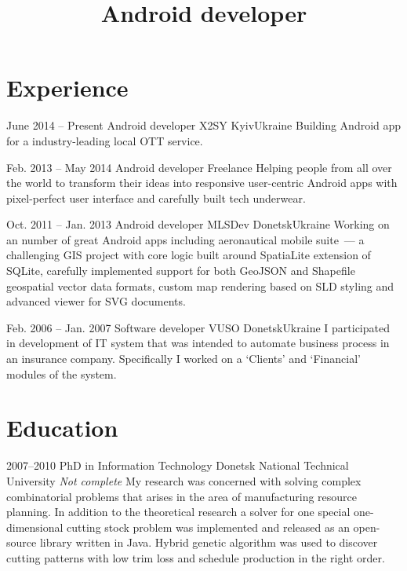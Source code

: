 \documentclass[11pt,a4paper,roman]{moderncv}        %
\title{Android developer}
\begin{document}
\makecvtitle


\section{Experience}

\cventry
    {June 2014 -- Present}
    {Android developer}
    {X2SY}
    {Kyiv}{Ukraine}
    {Building Android app for a industry-leading local OTT service.\newline}

\cventry
    {Feb. 2013 -- May 2014}
    {Android developer}
    {Freelance}
    {}{}
    {Helping people from all over the world to transform their ideas into 
    responsive user-centric Android apps with pixel-perfect user interface and 
    carefully built tech underwear.\newline}

\cventry
    {Oct. 2011 -- Jan. 2013}
    {Android developer}
    {MLSDev}
    {Donetsk}{Ukraine}
    {Working on an number of great Android apps including aeronautical mobile 
    suite~--- a challenging GIS project with core logic built around SpatiaLite 
    extension of SQLite, carefully implemented support for both GeoJSON and 
    Shapefile geospatial vector data formats, custom map rendering based on SLD 
    styling and advanced viewer for SVG documents.\newline}

\cventry
    {Feb. 2006 -- Jan. 2007}
    {Software developer}
    {VUSO}
    {Donetsk}{Ukraine}
    {I participated in development of IT system that was intended to automate 
    business process in an insurance company. Specifically I worked on a 
    `Clients' and `Financial' modules of the system.}

\medskip
\section{Education}

\cventry
    {2007--2010}
    {PhD in Information Technology}
    {Donetsk National Technical University}
    {}
    {\newline\textit{Not complete}}
    {My research was concerned with solving complex combinatorial problems that
    arises in the area of manufacturing resource planning. In addition to the
    theoretical research a solver for one special one-dimensional cutting stock
    problem was implemented and released as an open-source library written in
    Java. Hybrid genetic algorithm was used to discover cutting patterns with
    low trim loss and schedule production in the right order.\newline}
    
\end{document}
